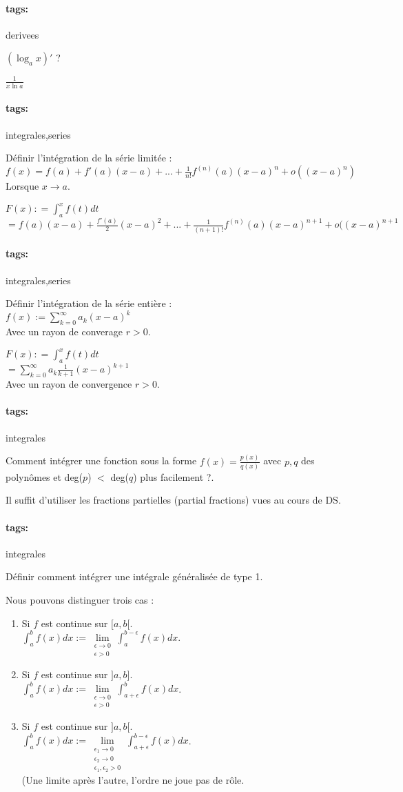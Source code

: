 \documentclass[12pt]{article}
\newcommand*{\xfield}[1]{\begin{mdframed}\centering #1\end{mdframed}\bigskip}
\newenvironment{note}{}{}
\newcommand*{\tags}[1]{\paragraph{tags: }#1}
\begin{document}
\begin{note}
	\tags{derivees}
	\xfield{$(\log_a x)'$ ?}
	\xfield{$\frac{1}{x\ln a}$}
\end{note}

\begin{note}
	\tags{integrales,series}
	\xfield{Définir l'intégration de la série limitée :\\
	$f(x) = f(a) + f'(a) (x-a) + ... + \frac{1}{n!}f^{(n)}(a)(x-a)^n + o((x-a)^n)$\\
	Lorsque $x \to a$.}
	\xfield{$F(x) : = \int_a^x f(t)dt$\\
	$=f(a)(x-a)+\frac{f'(a)}{2}(x-a)^2 + ... + \frac{1}{(n+1)!}f^{(n)}(a)(x-a)^{n+1} + o((x-a)^{n+1}$}
\end{note}

\begin{note}
	\tags{integrales,series}
	\xfield{Définir l'intégration de la série entière :\\
	$f(x) := \sum\limits_{k = 0}^{\infty} a_k (x-a)^k$\\
	Avec un rayon de converage $r>0$.}
	\xfield{$F(x) : = \int_a^x f(t)dt$\\
	$= \sum\limits_{k = 0}^{\infty} a_k \frac{1}{k+1}(x-a)^{k+1}$\\
	Avec un rayon de convergence $r>0$.}
\end{note}

\begin{note}
	\tags{integrales}
	\xfield{Comment intégrer une fonction sous la forme $f(x) = \frac{p(x)}{q(x)}$ avec $p,q$ des polynômes et deg($p$) $<$ deg($q$) plus facilement ?.}
	\xfield{Il suffit d'utiliser les fractions partielles (partial fractions) vues au cours de DS.}
\end{note}

\begin{note}
	\tags{integrales}
	\xfield{Définir comment intégrer une intégrale généralisée de type 1.}
	\xfield{Nous pouvons distinguer trois cas :\begin{enumerate}
		\item Si $f$ est continue sur $[a,b[$.\\
			$\int_a^b f(x)dx := \lim\limits_{\substack{\epsilon \to 0 \\ \epsilon > 0}} \int_a^{b-\epsilon}f(x)dx$.
		\item Si $f$ est continue sur $]a,b]$.\\
			$\int_a^b f(x)dx := \lim\limits_{\substack{\epsilon \to 0 \\ \epsilon > 0}} \int_{a+\epsilon}^{b}f(x)dx$.
		\item Si $f$ est continue sur $]a,b[$.\\
			$\int_a^b f(x)dx := \lim\limits_{\substack{\epsilon_1 \to 0 \\ \epsilon_2 \to 0 \\ \epsilon_1,\epsilon_2 > 0}} \int_{a+\epsilon}^{b-\epsilon}f(x)dx$.\\
			(Une limite après l'autre, l'ordre ne joue pas de rôle.
	\end{enumerate} }
\end{note}
\end{document}
